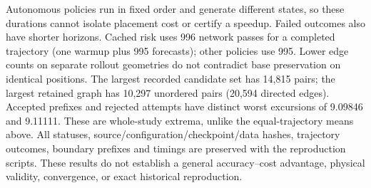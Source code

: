 Autonomous policies run in fixed order and generate different states, so these
durations cannot isolate placement cost or certify a speedup. Failed outcomes
also have shorter horizons. Cached risk uses 996 network passes for a completed
trajectory (one warmup plus 995 forecasts); other policies use 995. Lower edge
counts on separate rollout geometries do not contradict base preservation on
identical positions. The largest recorded candidate set has 14,815 pairs; the largest retained
graph has 10,297 unordered pairs (20,594 directed edges). Accepted prefixes
and rejected attempts have distinct worst excursions of 9.09846 and 9.11111.
These are whole-study extrema, unlike the equal-trajectory means above.
All statuses, source/configuration/checkpoint/data hashes,
trajectory outcomes, boundary prefixes and timings are preserved with the
reproduction scripts. These results do not establish a general accuracy--cost
advantage, physical validity, convergence, or exact historical reproduction.
